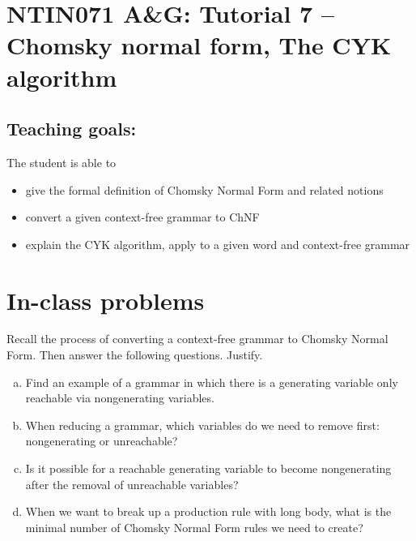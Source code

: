 \documentclass[a4paper,12pt]{amsart}
\begin{document}
\thispagestyle{empty}

\section*{NTIN071 A\&G: Tutorial 7 -- Chomsky normal form, The CYK algorithm}

\medskip

\subsection*{Teaching goals:} The student is able to

    \begin{itemize}\setlength{\itemsep}{0pt}
        \item give the formal definition of Chomsky Normal Form and related notions
        \item convert a given context-free grammar to ChNF
        \item explain the CYK algorithm, apply to a given word and context-free grammar
    \end{itemize}

\medskip

\section*{In-class problems}


\medskip\begin{problem}
    
    Recall the process of converting a context-free grammar to Chomsky Normal Form. Then answer the following questions. Justify.
    
    \begin{enumerate}[(a)]\setlength{\itemsep}{6pt}
        \item Find an example of a grammar in which there is a generating variable only reachable via nongenerating variables.
        \item When reducing a grammar, which variables do we need to remove first: nongenerating or unreachable?
        \item Is it possible for a reachable generating variable to become nongenerating after the removal of unreachable variables?
        \item When we want to break up a production rule with long body, what is the minimal number of Chomsky Normal Form rules we need to create?
    \end{enumerate}

\end{problem}
\end{document}
